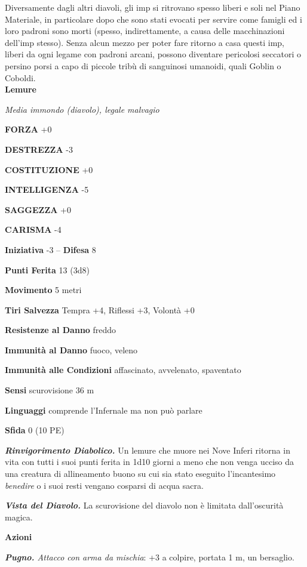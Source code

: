 \begin{multicols}{2}
Diversamente dagli altri diavoli, gli imp si ritrovano spesso liberi e soli nel Piano Materiale, in particolare dopo che sono stati evocati per servire come famigli ed i loro padroni sono morti (spesso, indirettamente, a causa delle macchinazioni dell'imp stesso). Senza alcun mezzo per poter fare ritorno a casa questi imp, liberi da ogni legame con padroni arcani, possono diventare pericolosi seccatori o persino porsi a capo di piccole tribù di sanguinosi umanoidi, quali Goblin o Coboldi.\\


\medskip{}\textbf{Lemure}

\emph{Media immondo (diavolo), legale malvagio}

\textbf{FORZA} +0

\textbf{DESTREZZA} -3

\textbf{COSTITUZIONE} +0

\textbf{INTELLIGENZA} -5

\textbf{SAGGEZZA} +0

\textbf{CARISMA} -4

\textbf{Iniziativa} -3 -- \textbf{Difesa} 8

\textbf{Punti Ferita} 13 (3d8)

\textbf{Movimento} 5 metri

\textbf{Tiri Salvezza} Tempra +4, Riflessi +3, Volontà +0

\textbf{Resistenze al Danno} freddo

\textbf{Immunità al Danno} fuoco, veleno

\textbf{Immunità alle Condizioni} affascinato, avvelenato, spaventato

\textbf{Sensi} scurovisione 36 m

\textbf{Linguaggi} comprende l'Infernale ma non può parlare

\textbf{Sfida} 0 (10 PE)

\emph{\textbf{Rinvigorimento Diabolico.}} Un lemure che muore nei Nove Inferi ritorna in vita con tutti i suoi punti ferita in 1d10 giorni a meno che non venga ucciso da una creatura di allineamento buono su cui sia stato eseguito l'incantesimo \emph{benedire} o i suoi resti vengano
cosparsi di acqua sacra.

\emph{\textbf{Vista del Diavolo.}} La scurovisione del diavolo non è limitata dall'oscurità magica.

\textbf{Azioni}

\emph{\textbf{Pugno.} Attacco con arma da mischia}: +3 a colpire, portata 1 m, un bersaglio.


\end{multicols}
